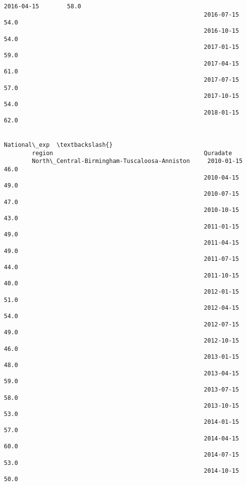 \documentclass[11pt]{article}
\begin{document}
\begin{Verbatim}[commandchars=\\\{\}]
                                                         2016-04-15        58.0   
                                                         2016-07-15        54.0   
                                                         2016-10-15        54.0   
                                                         2017-01-15        59.0   
                                                         2017-04-15        61.0   
                                                         2017-07-15        57.0   
                                                         2017-10-15        54.0   
                                                         2018-01-15        62.0   
        
                                                                     National\_exp  \textbackslash{}
        region                                           Quradate                   
        North\_Central-Birmingham-Tuscaloosa-Anniston     2010-01-15          46.0   
                                                         2010-04-15          49.0   
                                                         2010-07-15          47.0   
                                                         2010-10-15          43.0   
                                                         2011-01-15          49.0   
                                                         2011-04-15          49.0   
                                                         2011-07-15          44.0   
                                                         2011-10-15          40.0   
                                                         2012-01-15          51.0   
                                                         2012-04-15          54.0   
                                                         2012-07-15          49.0   
                                                         2012-10-15          46.0   
                                                         2013-01-15          48.0   
                                                         2013-04-15          59.0   
                                                         2013-07-15          58.0   
                                                         2013-10-15          53.0   
                                                         2014-01-15          57.0   
                                                         2014-04-15          60.0   
                                                         2014-07-15          53.0   
                                                         2014-10-15          50.0   

\end{Verbatim}
\end{document}
